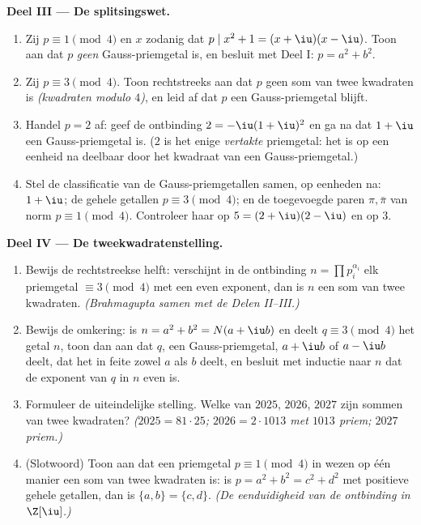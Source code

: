 \begin{problem}
\medskip
\noindent\textbf{Deel III --- De splitsingswet.}
\begin{enumerate}[resume]
  \item Zij $p \equiv 1 \pmod 4$ en $x$ zodanig dat $p \mid x^2 + 1
        = (x + \iu)(x - \iu)$. Toon aan dat $p$ \emph{geen}
        Gauss-priemgetal is, en besluit met Deel I: $p = a^2 +
        b^2$.
  \item Zij $p \equiv 3 \pmod 4$. Toon rechtstreeks aan dat $p$
        geen som van twee kwadraten is \emph{(kwadraten modulo
        $4$)}, en leid af dat $p$ een Gauss-priemgetal blijft.
  \item Handel $p = 2$ af: geef de ontbinding $2 = -\iu(1+\iu)^2$
        en ga na dat $1 + \iu$ een Gauss-priemgetal is. ($2$ is het
        enige \emph{vertakte} priemgetal: het is op een eenheid na
        deelbaar door het kwadraat van een Gauss-priemgetal.)
  \item Stel de classificatie van de Gauss-priemgetallen samen, op
        eenheden na: $1 + \iu$; de gehele getallen $p \equiv 3
        \pmod 4$; en de toegevoegde paren $\pi, \bar\pi$ van norm
        $p \equiv 1 \pmod 4$. Controleer haar op $5 =
        (2+\iu)(2-\iu)$ en op $3$.
\end{enumerate}

\medskip
\noindent\textbf{Deel IV --- De tweekwadratenstelling.}
\begin{enumerate}[resume]
  \item Bewijs de rechtstreekse helft: verschijnt in de ontbinding
        $n = \prod p_i^{\alpha_i}$ elk priemgetal $\equiv 3 \pmod
        4$ met een even exponent, dan is $n$ een som van twee
        kwadraten. \emph{(Brahmagupta samen met de Delen
        II--III.)}
  \item Bewijs de omkering: is $n = a^2 + b^2 = N(a + \iu b)$ en
        deelt $q \equiv 3 \pmod 4$ het getal $n$, toon dan aan dat
        $q$, een Gauss-priemgetal, $a + \iu b$ of $a - \iu b$
        deelt, dat het in feite zowel $a$ als $b$ deelt, en besluit
        met inductie naar $n$ dat de exponent van $q$ in $n$ even
        is.
  \item Formuleer de uiteindelijke stelling. Welke van $2025$,
        $2026$, $2027$ zijn sommen van twee kwadraten? \emph{($2025
        = 81 \cdot 25$; $2026 = 2 \cdot 1013$ met $1013$ priem;
        $2027$ priem.)}
  \item (Slotwoord) Toon aan dat een priemgetal $p \equiv 1 \pmod
        4$ in wezen op één manier een som van twee kwadraten is:
        is $p = a^2 + b^2 = c^2 + d^2$ met positieve gehele
        getallen, dan is $\{a, b\} = \{c, d\}$. \emph{(De
        eenduidigheid van de ontbinding in $\Z[\iu]$.)}
\end{enumerate}


\end{problem}
